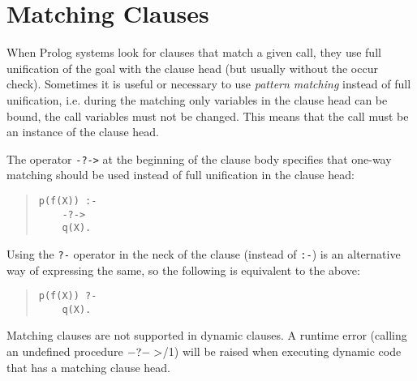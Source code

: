 \section{Matching Clauses}
\label{matching}

When Prolog systems look for clauses that match a given call,
they use full unification of the goal with the clause head
(but usually without the occur check).
Sometimes it is useful or necessary to use {\it pattern matching}
instead of full unification, i.e. during the matching
only variables in the clause head can be bound, the call
variables must not be changed.
This means that the call must be an instance of the
clause head.

The operator \verb.-?->. at the beginning of the clause
body specifies that one-way matching should be used
instead of full unification in the clause head:
\begin{quote}
\begin{verbatim}
p(f(X)) :-
    -?->
    q(X).
\end{verbatim}
\end{quote}
Using the \verb.?-. operator in the neck of the clause (instead of
\verb.:-.) is an alternative way of expressing the same, so the following
is equivalent to the above:
\begin{quote}
\begin{verbatim}
p(f(X)) ?-
    q(X).
\end{verbatim}
\end{quote}

Matching clauses are not supported in dynamic clauses. A runtime error
(calling an undefined procedure $-?->$/1) will be raised when
executing dynamic code that has a matching clause head.

